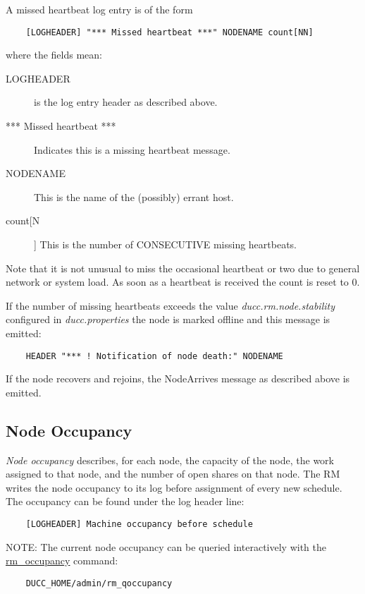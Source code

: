     A missed heartbeat log entry is of the form
\begin{verbatim}
    [LOGHEADER] "*** Missed heartbeat ***" NODENAME count[NN]
\end{verbatim}
    where the fields mean:
    \begin{description}
      \item[LOGHEADER] is the log entry header as described above.
      \item[*** Missed heartbeat ***] Indicates this is a missing heartbeat message.
      \item[NODENAME] This is the name of the (possibly) errant host.
      \item[count[N]] This is the number of CONSECUTIVE missing heartbeats.
    \end{description}

    Note that it is not unusual to miss the occasional heartbeat or two due to general network or system load.
    As soon as a heartbeat is received the count is reset to 0.

    If the number of missing heartbeats exceeds the value {\em ducc.rm.node.stability} configured in
    {\em ducc.properties} the node is marked offline and this message is emitted:
\begin{verbatim}
    HEADER "*** ! Notification of node death:" NODENAME
\end{verbatim}

    If the node recovers and rejoins, the NodeArrives message as described above is emitted.

\subsection{Node Occupancy}
    {\em Node occupancy} describes, for each node, the capacity of the node, the work assigned to
    that node, and the number of open shares on that node.  The RM writes the node occupancy 
    to its log before assignment of every new schedule.  The occupancy can be found under the log header line:
\begin{verbatim}
    [LOGHEADER] Machine occupancy before schedule
\end{verbatim}

    NOTE: The current node occupancy can be queried interactively with the 
    \hyperref[subsec:admin.rm-qoccupancy]{rm\_occupancy} command:
\begin{verbatim}
    DUCC_HOME/admin/rm_qoccupancy
\end{verbatim}

